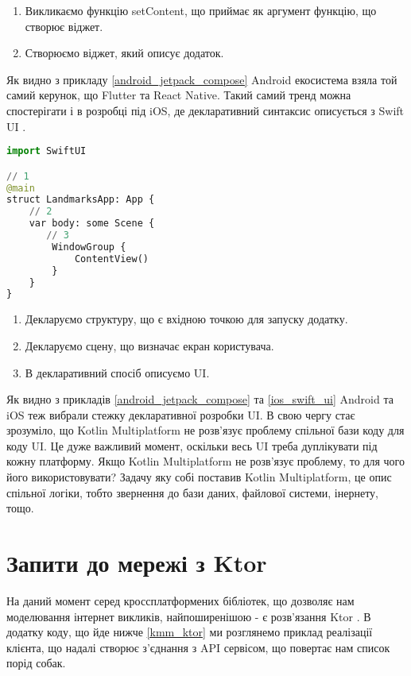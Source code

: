\begin{enumerate}
    \item Викликаємо функцію setContent, що приймає як аргумент функцію, що створює віджет.
    \item Створюємо віджет, який описує додаток.
\end{enumerate}

Як видно з прикладу \ref{android_jetpack_compose} Android екосистема взяла той самий керунок, що Flutter та React Native.
Такий самий тренд можна спостерігати і в розробці під iOS, де декларативний синтаксис описується з Swift UI \cite{swift_ui}.

\begin{lstlisting}[style=light, language=Python,label={lst:ios_swift_ui},caption=Swift UI]
import SwiftUI

// 1
@main
struct LandmarksApp: App {
    // 2
    var body: some Scene {
       // 3
        WindowGroup {
            ContentView()
        }
    }
}
\end{lstlisting}

\begin{enumerate}
    \item Декларуємо структуру, що є вхідною точкою для запуску додатку.
    \item Декларуємо сцену, що визначає екран користувача.
    \item В декларативний спосіб описуємо UI.
\end{enumerate}

Як видно з прикладів \ref{android_jetpack_compose} та \ref{ios_swift_ui} Android та iOS теж вибрали стежку декларативної розробки UI.
В свою чергу стає зрозуміло, що Kotlin Multiplatform не розв'язує проблему спільної бази коду для коду UI.
Це дуже важливий момент, оскільки весь UI треба дуплікувати під кожну платформу.
Якщо Kotlin Multiplatform не розв'язує проблему, то для чого його використовувати?
Задачу яку собі поставив Kotlin Multiplatform, це опис спільної логіки, тобто звернення до бази даних, файлової системи, інернету, тощо.


\section{Запити до мережі з Ktor}
\label{section.4.2}
На даний момент серед кроссплатформених бібліотек, що дозволяє нам моделювання інтернет викликів, найпоширенішою - є розв'язання Ktor \cite{ktor_home_page}.
В додатку коду, що йде нижче \ref{kmm_ktor} ми розглянемо приклад реалізації клієнта, що надалі створює з'єднання з API сервісом, що повертає нам список порід собак.

